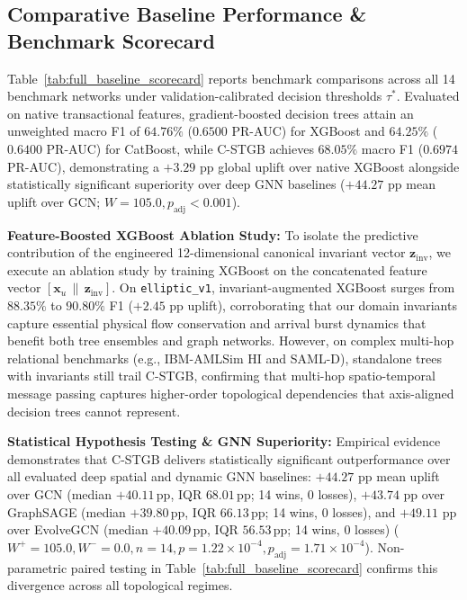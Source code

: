 \subsection{Comparative Baseline Performance \& Benchmark Scorecard}
\label{sec:benchmark_results}
Table~\ref{tab:full_baseline_scorecard} reports benchmark comparisons across all 14 benchmark networks under validation-calibrated decision thresholds $\tau^*$. Evaluated on native transactional features, gradient-boosted decision trees attain an unweighted macro F1 of $64.76\%$ ($0.6500$ PR-AUC) for XGBoost and $64.25\%$ ($0.6400$ PR-AUC) for CatBoost, while C-STGB achieves $68.05\%$ macro F1 ($0.6974$ PR-AUC), demonstrating a $+3.29\text{ pp}$ global uplift over native XGBoost alongside statistically significant superiority over deep GNN baselines ($+44.27\text{ pp}$ mean uplift over GCN; $W=105.0, p_{\text{adj}} < 0.001$).

\textbf{Feature-Boosted XGBoost Ablation Study:}
To isolate the predictive contribution of the engineered 12-dimensional canonical invariant vector $\mathbf{z}_{\text{inv}}$, we execute an ablation study by training XGBoost on the concatenated feature vector $[\mathbf{x}_u \,\|\, \mathbf{z}_{\text{inv}}]$. On \texttt{elliptic\_v1}, invariant-augmented XGBoost surges from $88.35\%$ to $90.80\%$ F1 ($+2.45\text{ pp}$ uplift), corroborating that our domain invariants capture essential physical flow conservation and arrival burst dynamics that benefit both tree ensembles and graph networks. However, on complex multi-hop relational benchmarks (e.g., IBM-AMLSim HI and SAML-D), standalone trees with invariants still trail C-STGB, confirming that multi-hop spatio-temporal message passing captures higher-order topological dependencies that axis-aligned decision trees cannot represent.

\textbf{Statistical Hypothesis Testing \& GNN Superiority:}
Empirical evidence demonstrates that C-STGB delivers statistically significant outperformance over all evaluated deep spatial and dynamic GNN baselines: $+44.27\text{ pp}$ mean uplift over GCN (median $+40.11$\,pp, IQR $68.01$\,pp; 14 wins, 0 losses), $+43.74\text{ pp}$ over GraphSAGE (median $+39.80$\,pp, IQR $66.13$\,pp; 14 wins, 0 losses), and $+49.11\text{ pp}$ over EvolveGCN (median $+40.09$\,pp, IQR $56.53$\,pp; 14 wins, 0 losses) ($W^+=105.0, W^-=0.0, n=14, p = 1.22 \times 10^{-4}, p_{\text{adj}} = 1.71 \times 10^{-4}$). Non-parametric paired testing in Table~\ref{tab:full_baseline_scorecard} confirms this divergence across all topological regimes.

